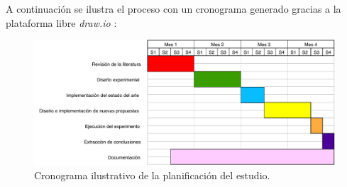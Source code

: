 A continuación se ilustra el proceso con un cronograma generado gracias a la plataforma libre \textit{draw.io} \cite{draw.io}:

\begin{figure}[H]
	\centering
	\includegraphics[scale=0.6]{imagenes/cronograma.pdf}
	\caption{Cronograma ilustrativo de la planificación del estudio.}
	\label{cronograma}
\end{figure}
